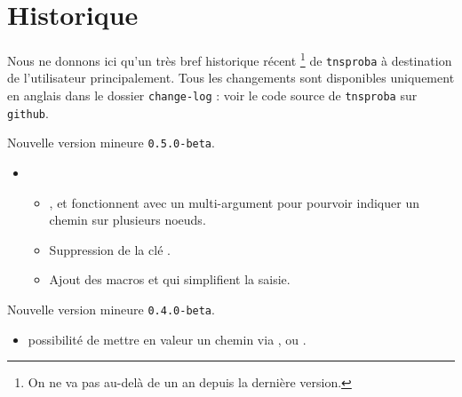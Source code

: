 \documentclass[12pt,a4paper]{article}
\begin{document}
\newpage

\section{Historique}

Nous ne donnons ici qu'un très bref historique récent
\footnote{
	On ne va pas au-delà de un an depuis la dernière version.
}
de \verb+tnsproba+ à destination de l'utilisateur principalement.
Tous les changements sont disponibles uniquement en anglais dans le dossier \verb+change-log+ : voir le code source de \verb+tnsproba+ sur \verb+github+.

\begin{description}

    \medskip
    \item[2020-08-05] Nouvelle version mineure \verb+0.5.0-beta+.
    
    \begin{itemize}[itemsep=.5em]
        \item {}
        \begin{itemize}[itemsep=.5em]
            \item {},  et  fonctionnent avec un multi-argument pour pourvoir indiquer un chemin sur plusieurs noeuds.
            
            \item Suppression de la clé .
            
            \item Ajout des macros  et  qui simplifient la saisie.
        \end{itemize}
    \end{itemize}
    
    \separation


    \medskip
    \item[2020-07-31] Nouvelle version mineure \verb+0.4.0-beta+.
    
    \begin{itemize}[itemsep=.5em]
        \item {}
        	  possibilité de mettre en valeur un chemin via ,   ou .
    \end{itemize}
    
    \separation


\end{description}
\end{document}

